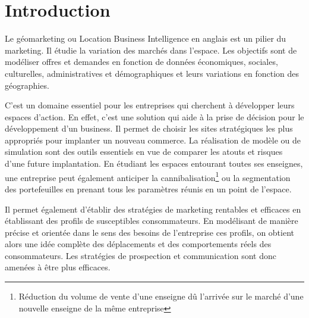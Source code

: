 \documentclass{themeensg}
\begin{document}
  \begin{acronym}
  \end{acronym}


\chapter*{Introduction}

Le géomarketing ou Location Business Intelligence en anglais est un pilier du marketing. Il étudie la variation des marchés dans l’espace. Les objectifs sont de modéliser offres et demandes en fonction de données économiques, sociales, culturelles, administratives et démographiques et leurs variations en fonction des géographies.

C’est un domaine essentiel pour les entreprises qui cherchent à développer leurs espaces d’action. En effet, c’est une solution qui aide à la prise de décision pour le développement d’un business. Il permet de choisir les sites stratégiques les plus appropriés pour implanter un nouveau commerce. La réalisation de modèle ou de simulation sont des outils essentiels en vue de comparer les atouts et risques d’une future implantation. En étudiant les espaces entourant toutes ses enseignes, une entreprise peut également anticiper la cannibalisation\footnote{Réduction du volume de vente d'une enseigne dû l'arrivée sur le marché d'une nouvelle enseigne de la même entreprise} ou la segmentation des portefeuilles en prenant tous les paramètres réunis en un point de l’espace.

Il permet également d’établir des stratégies de marketing rentables et efficaces en établissant des profils de susceptibles consommateurs. En modélisant de manière précise et orientée dans le sens des besoins de l’entreprise ces profils, on obtient alors une idée complète des déplacements et des comportements réels des consommateurs. Les stratégies de prospection et communication sont donc amenées à être plus efficaces.
\end{document}
